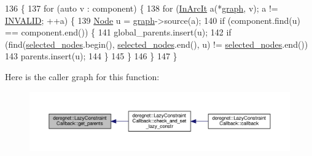 \begin{DoxyCode}
136                                                                        \{
137     \textcolor{keywordflow}{for} (\textcolor{keyword}{auto} v : component) \{
138         \textcolor{keywordflow}{for} (\hyperlink{namespacederegnet_aed58be361aeda4ef7a9eaca2731ba830}{InArcIt} a(*\hyperlink{classderegnet_1_1LazyConstraintCallback_af481c9d68dea2dab035e1f2f79cda4d5}{graph}, v); a != \hyperlink{usinglemon_8hpp_adf770fe2eec438e3758ffe905dbae208}{INVALID}; ++a) \{
139             \hyperlink{namespacederegnet_a744bad34f2de9856d36715a445f027f3}{Node} u = \hyperlink{classderegnet_1_1LazyConstraintCallback_af481c9d68dea2dab035e1f2f79cda4d5}{graph}->source(a);
140             \textcolor{keywordflow}{if} (component.find(u) == component.end()) \{
141                 global\_parents.insert(u);
142                 \textcolor{keywordflow}{if} (find(\hyperlink{classderegnet_1_1LazyConstraintCallback_a5ddc4662e6e5c9f1d191c15edbefaa9b}{selected\_nodes}.begin(), \hyperlink{classderegnet_1_1LazyConstraintCallback_a5ddc4662e6e5c9f1d191c15edbefaa9b}{selected\_nodes}.end(), u) != 
      \hyperlink{classderegnet_1_1LazyConstraintCallback_a5ddc4662e6e5c9f1d191c15edbefaa9b}{selected\_nodes}.end())
143                     parents.insert(u);
144             \}
145         \}
146     \}
147 \}
\end{DoxyCode}
Here is the caller graph for this function\+:\nopagebreak
\begin{figure}[H]
\begin{center}
\leavevmode
\includegraphics[width=350pt]{classderegnet_1_1LazyConstraintCallback_ab1357c9415e190aaa56ed87022ec0b82_icgraph}
\end{center}
\end{figure}
\mbox{\label{classderegnet_1_1LazyConstraintCallback_aebc9854e98523c99d3f856ff71bb86fb}} 
